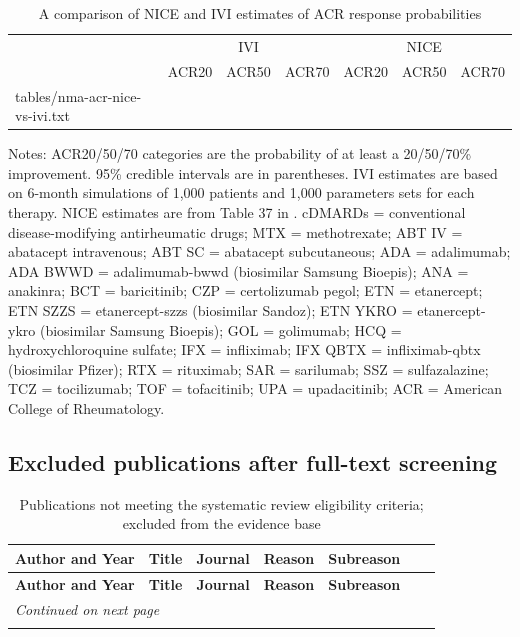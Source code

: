 \documentclass[11pt,final,fleqn]{article}
\makeatletter
\theoremstyle{plain}
\newcommand*\ExpandableInput[1]{\@@input#1 }
\makeatother
\begin{document}
\begin{appendices}
\begin{table}[!ht]
\begin{center}
\scriptsize
\begin{threeparttable}
\caption{A comparison of NICE and IVI estimates of ACR response probabilities} \label{tbl:nma-acr-nice-vs-ivi}
\begin{tabularx}{\textwidth}{@{\extracolsep{\fill}}lrrrrrr}
\hline
\multicolumn{1}{c}{} & \multicolumn{3}{c}{IVI} & \multicolumn{3}{c}{NICE}\\
\cmidrule(lr){2-4} \cmidrule(lr){5-7}
\multicolumn{1}{l}{} & \multicolumn{1}{c}{ACR20} & \multicolumn{1}{c}{ACR50} & \multicolumn{1}{c}{ACR70} & \multicolumn{1}{c}{ACR20} & \multicolumn{1}{c}{ACR50} & \multicolumn{1}{c}{ACR70}\\
\hline
\ExpandableInput{tables/nma-acr-nice-vs-ivi.txt}
\hline
\end{tabularx}
\scriptsize
Notes: ACR20/50/70 categories are the probability of at least a 20/50/70\% improvement. 95\% credible intervals are in parentheses. IVI estimates are based on 6-month simulations of 1,000 patients and 1,000 parameters sets for each therapy. NICE estimates are from Table 37 in \citet{stevenson2017cost}. cDMARDs = conventional disease-modifying antirheumatic drugs; MTX = methotrexate; ABT IV = abatacept intravenous; ABT SC = abatacept subcutaneous; ADA = adalimumab; ADA BWWD = adalimumab-bwwd (biosimilar Samsung Bioepis); ANA = anakinra; BCT = baricitinib; CZP = certolizumab pegol; ETN = etanercept; ETN SZZS = etanercept-szzs (biosimilar Sandoz); ETN YKRO = etanercept-ykro (biosimilar Samsung Bioepis); GOL = golimumab; HCQ = hydroxychloroquine sulfate; IFX = infliximab; IFX QBTX = infliximab-qbtx (biosimilar Pfizer); RTX = rituximab; SAR = sarilumab; SSZ = sulfazalazine; TCZ = tocilizumab; TOF = tofacitinib; UPA = upadacitinib;  ACR = American College of Rheumatology. 
\end{threeparttable}
\end{center}
\end{table}

\FloatBarrier

\subsection{Excluded publications after full-text screening}

\begin{landscape}
\scriptsize
\begin{longtable}{p{2cm}p{8cm}p{4cm}p{2cm}p{2cm}}
\caption{Publications not meeting the systematic review eligibility criteria; excluded from the evidence base} 
\label{tbl:excluded-publications} \\
\hline
\textbf{Author and Year}&\textbf{Title}&\textbf{Journal}&\textbf{Reason}&\textbf{Subreason}& \\
\hline
\endfirsthead
\hline
\textbf{Author and Year}&\textbf{Title}&\textbf{Journal}&\textbf{Reason}&\textbf{Subreason}& \\
\hline
\endhead
\hline 
\multicolumn{7}{l}{\emph{Continued on next page}} \\
\endfoot
\endlastfoot


\end{longtable}
\end{landscape}
\end{appendices}
\end{document}
